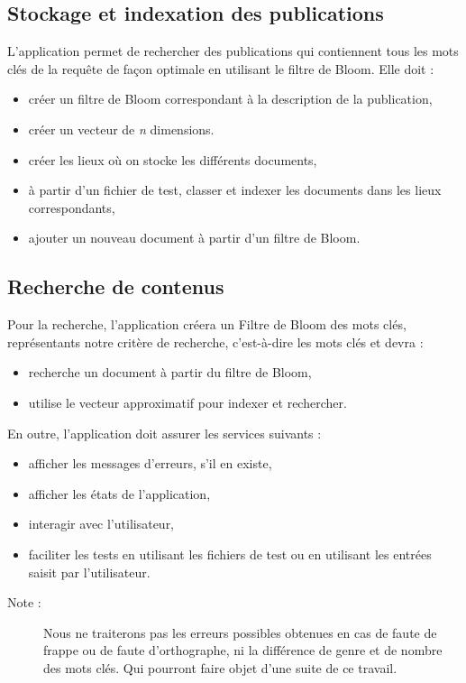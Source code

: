 	\subsection{Stockage et indexation des publications}
	L’application permet de rechercher des publications qui contiennent tous les mots clés de la requête de façon optimale en utilisant le filtre de Bloom. Elle doit :
	\begin{itemize}
	
	\item créer un filtre de Bloom correspondant à la description de la publication, 
	\item créer un vecteur de \textit{n} dimensions.
	\item créer les lieux où on stocke les différents documents,
	\item à partir d'un fichier de test, classer et indexer les documents dans les lieux correspondants,		
	\item ajouter un nouveau document à partir d'un filtre de Bloom.				\end{itemize}
	
	\subsection{Recherche de contenus}
	Pour la recherche, l’application créera un Filtre de Bloom des mots clés, représentants notre critère de recherche, c’est-à-dire les mots clés et devra :
	\begin{itemize}
		\item recherche un document à partir du filtre de Bloom,
 		\item utilise le vecteur approximatif pour indexer et rechercher.
	\end{itemize}
	
En outre, l’application doit assurer les services suivants :

	\begin{itemize}
	\item afficher les messages d'erreurs, s'il en existe,	
	\item afficher les états de l'application,	
	\item interagir avec l'utilisateur,
	\item faciliter les tests en utilisant les fichiers de test ou en utilisant les entrées saisit par l'utilisateur.
	\end{itemize}
	\begin{description}
		\item[Note :] Nous ne traiterons pas les erreurs  possibles obtenues en cas de faute de frappe ou de faute d’orthographe, ni la différence de genre et de nombre des mots clés. Qui pourront faire objet d’une suite de ce travail.
	\end{description}